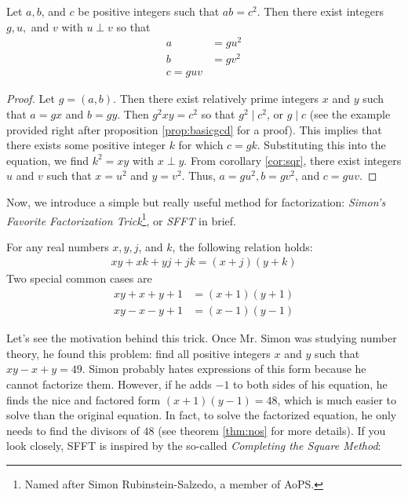\documentclass{subfile}
\begin{document}
	\begin{theorem}
		Let $a,b$, and $c$ be positive integers such that $ab=c^2$. Then there exist integers $g,u,$ and $v$ with $u\perp v$ so that
		\begin{align*}
			a
				& = gu^2\\
			b
				& = gv^2\\
			c = guv
		\end{align*}
	\end{theorem}

	\begin{proof}
		Let $g=(a,b)$. Then there exist relatively prime integers $x$ and $y$ such that $a=gx$ and $b=gy$. Then $g^2xy=c^2$ so that $g^2\mid c^2$, or $g\mid c$ (see the example provided right after proposition \eqref{prop:basicgcd} for a proof). This implies that there exists some positive integer $k$ for which $c=gk$. Substituting this into the equation, we find $k^2=xy$ with $x\perp y$. From corollary \eqref{cor:sqr}, there exist integers $u$ and $v$ such that $x=u^2$ and $y=v^2$. Thus, $a=gu^2,b=gv^2$, and $c=guv$.
	\end{proof}
	Now, we introduce a simple but really useful method for factorization: \textit{Simon's Favorite Factorization Trick}\footnote{Named after Simon Rubinstein-Salzedo, a member of AoPS.}, or \textit{SFFT} in brief.
	\begin{proposition}[SFFT]
		For any real numbers $x,y, j$, and $k$, the following relation holds:
		\begin{align*}
			xy+xk+yj+jk=(x+j)(y+k)
		\end{align*}
		Two special common cases are
			\begin{align*}
				xy + x + y + 1
					& = (x+1)(y+1)\\
				xy - x - y +1
					& = (x-1)(y-1)
			\end{align*}
	\end{proposition}
	Let's see the motivation behind this trick. Once Mr. Simon was studying number theory, he found this problem: find all positive integers $x$ and $y$ such that $xy-x+y=49$. Simon probably hates expressions of this form because he cannot factorize them. However, if he adds $-1$ to both sides of his equation, he finds the nice and factored form $(x+1)(y-1)=48$, which is much easier to solve than the original equation. In fact, to solve the factorized equation, he only needs to find the divisors of $48$ (see theorem \autoref{thm:nos} for more details). If you look closely, SFFT is inspired by the so-called \textit{Completing the Square Method}:
\end{document}
